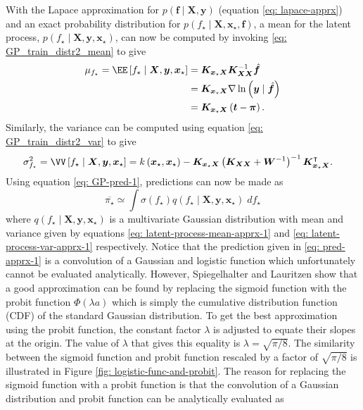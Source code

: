 With the Lapace approximation for $p \left( \bm{f} \mid \bm{X} , \bm{y} \right)$ (equation \ref{eq: lapace-apprx}) and an exact probability distribution for $p \left( f_{\star} \mid \bm{X} , \bm{x}_{\star}, \bm{f} \right)$, a mean for the latent process, $p \left( f_{\star} \mid \bm{X} , \bm{y} , \bm{x}_{\star} \right)$, can now be computed by invoking \ref{eq: GP_train_distr2_mean} to give
\begin{align}
    \mu_{f_{\star}} = \EE \left[ f_{\star} \mid \bm{X} , \bm{y} , \bm{x}_{\star} \right]
     & = \bm{K}_{\bm{x}_{\star} \bm{X}} \bm{K}_{\bm{X} \bm{X}}^{-1} \hat{\bm{f}}           \nonumber               \\
     & = \bm{K}_{\bm{x}_{\star} \bm{X}} \nabla \ln \left( \bm{y} \mid \hat{\bm{f}} \right) \nonumber               \\
     & = \bm{K}_{\bm{x}_{\star} \bm{X}} \left( \bm{t} - \bm{\pi} \right) \label{eq: latent-process-mean-apprx-1} .
\end{align}
Similarly, the variance can be computed using equation \ref{eq: GP_train_distr2_var} to give
\begin{align} \label{eq: latent-process-var-apprx-1}
    \sigma_{f_{\star}}^2 = \VV \left[ f_{\star} \mid \bm{X} , \bm{y} , \bm{x}_{\star} \right]
     & = k \left( \bm{x}_{\star} , \bm{x}_{\star} \right) - \bm{K}_{\bm{x}_{\star} \bm{X}} \left( \bm{K}_{\bm{X} \bm{X}} + \bm{W}^{-1} \right)^{-1} \bm{K}_{\bm{x}_{\star} \bm{X}}^{\intercal}.
\end{align}
Using equation \ref{eq: GP-pred-1}, predictions can now be made as
\begin{equation} \label{eq: pred-apprx-1}
    \overline{\pi_{\star}} \simeq \int \sigma \left( f_{\star} \right) q \left( f_{\star} \mid \bm{X} , \bm{y} , \bm{x}_{\star} \right) \; d f_{\star}
\end{equation}
where $q \left( f_{\star} \mid \bm{X} , \bm{y} , \bm{x}_{\star} \right)$ is a multivariate Gaussian distribution with mean and variance given by equations \ref{eq: latent-process-mean-apprx-1} and \ref{eq: latent-process-var-apprx-1} respectively. Notice that the prediction given in \ref{eq: pred-apprx-1} is a convolution of a Gaussian and logistic function which unfortunately cannot be evaluated analytically. However, Spiegelhalter and Lauritzen \cite{spiegelhalter1990sequential} show that a good approximation can be found by replacing the sigmoid function with the probit function $\Phi \left( \lambda a \right)$ which is simply the cumulative distribution function (CDF) of the standard Gaussian distribution. To get the best approximation using the probit function, the constant factor $\lambda$ is adjusted to equate their slopes at the origin. The value of $\lambda$ that gives this equality is $\lambda = \sqrt{\pi / 8}$. The similarity between the sigmoid function and probit function rescaled by a factor of $\sqrt{\pi / 8}$ is illustrated in Figure \ref{fig: logistic-func-and-probit}. The reason for replacing the sigmoid function with a probit function is that the convolution of a Gaussian distribution and probit function can be analytically evaluated as
